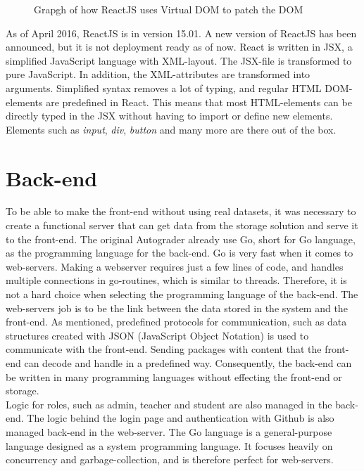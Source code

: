 \begin{figure}[h]
\centering
{}
\caption{Grapgh of how ReactJS uses Virtual DOM to patch the DOM}
\end{figure}

As of April 2016, ReactJS is in version 15.01. A new version of ReactJS has been announced, but it is not deployment ready as of now. React is written in JSX, a simplified JavaScript language with XML-layout. The JSX-file is transformed to pure JavaScript. In addition, the XML-attributes are transformed into arguments. Simplified syntax removes a lot of typing, and regular HTML DOM-elements are predefined in React. This means that most HTML-elements can be directly typed in the JSX without having to import or define new elements. Elements such as \emph{input}, \emph{div}, \emph{button} and many more are there out of the box.

\section{Back-end}
To be able to make the front-end without using real datasets, it was necessary to create a functional server that can get data from the storage solution and serve it to the front-end. The original Autograder already use Go, short for Go language, as the programming language for the back-end. Go is very fast when it comes to web-servers. Making a webserver requires just a few lines of code, and handles multiple connections in go-routines, which is similar to threads. Therefore, it is not a hard choice when selecting the programming language of the back-end. The web-servers job is to be the link between the data stored in the system and the front-end. As mentioned, predefined protocols for communication, such as data structures created with JSON (JavaScript Object Notation) is used to communicate with the front-end. Sending packages with content that the front-end can decode and handle in a predefined way. Consequently, the back-end can be written in many programming languages without effecting the front-end or storage. \\Logic for roles, such as admin, teacher and student are also managed in the back-end. The logic behind the login page and authentication with Github is also managed back-end in the web-server. The Go language is a general-purpose language designed as a system programming language. It focuses heavily on concurrency and garbage-collection, and is therefore perfect for web-servers.

